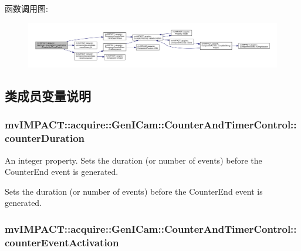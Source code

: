 函数调用图\+:
\nopagebreak
\begin{figure}[H]
\begin{center}
\leavevmode
\includegraphics[width=350pt]{classmv_i_m_p_a_c_t_1_1acquire_1_1_gen_i_cam_1_1_counter_and_timer_control_a9ca851d25166e401670195607f772ef4_cgraph}
\end{center}
\end{figure}




\subsection{类成员变量说明}
\hypertarget{classmv_i_m_p_a_c_t_1_1acquire_1_1_gen_i_cam_1_1_counter_and_timer_control_a08e6a31eafa31c6217d3fec3de878c61}{
\subsubsection[{counter\+Duration}]{ mv\+I\+M\+P\+A\+C\+T\+::acquire\+::\+Gen\+I\+Cam\+::\+Counter\+And\+Timer\+Control\+::counter\+Duration}}\label{classmv_i_m_p_a_c_t_1_1acquire_1_1_gen_i_cam_1_1_counter_and_timer_control_a08e6a31eafa31c6217d3fec3de878c61}


An integer property. Sets the duration (or number of events) before the Counter\+End event is generated. 

Sets the duration (or number of events) before the Counter\+End event is generated. \hypertarget{classmv_i_m_p_a_c_t_1_1acquire_1_1_gen_i_cam_1_1_counter_and_timer_control_ab70baba2a6ef16bf43522414274b3740}{
\subsubsection[{counter\+Event\+Activation}]{ mv\+I\+M\+P\+A\+C\+T\+::acquire\+::\+Gen\+I\+Cam\+::\+Counter\+And\+Timer\+Control\+::counter\+Event\+Activation}}\label{classmv_i_m_p_a_c_t_1_1acquire_1_1_gen_i_cam_1_1_counter_and_timer_control_ab70baba2a6ef16bf43522414274b3740}


